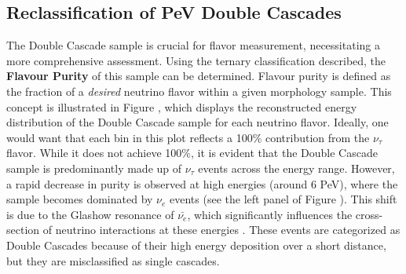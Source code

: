 
\subsection{Reclassification of PeV Double Cascades}
\label{sec:Pev_mask}
The Double Cascade sample is crucial for flavor measurement, necessitating a more comprehensive assessment. Using the ternary classification described, the \textbf{Flavour Purity} of this sample can be determined. Flavour purity is defined as the fraction of a \emph{desired} neutrino flavor within a given morphology sample. This concept is illustrated in Figure , which displays the reconstructed energy distribution of the Double Cascade sample for each neutrino flavor. Ideally, one would want that each bin in this plot reflects a 100\% contribution from the \(\nu_{\tau}\) flavor. While it does not achieve 100\%, it is evident that the Double Cascade sample is predominantly made up of \(\nu_{\tau}\) events across the energy range. However, a rapid decrease in purity is observed at high energies (around 6 PeV), where the sample becomes dominated by \(\nu_e\) events (see the left panel of Figure ). This shift is due to the Glashow resonance of \(\bar{\nu_e}\), which significantly influences the cross-section of neutrino interactions at these energies . These events are categorized as Double Cascades because of their high energy deposition over a short distance, but they are misclassified as single cascades.

